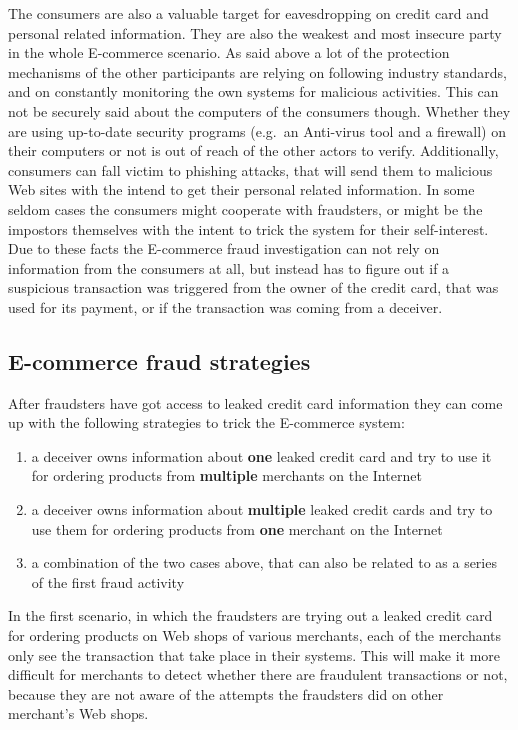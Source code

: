 The consumers are also a valuable target for eavesdropping on credit card and personal related information. They are also the weakest and most insecure party in the whole E-commerce scenario. As said above a lot of the protection mechanisms of the other participants are relying on following industry standards, and on constantly monitoring the own systems for malicious activities. This can not be securely said about the computers of the consumers though. Whether they are using up-to-date security programs (e.g.\ an Anti-virus tool and a firewall) on their computers or not is out of reach of the other actors to verify. Additionally, consumers can fall victim to phishing attacks, that will send them to malicious Web sites with the intend to get their personal related information. In some seldom cases the consumers might cooperate with fraudsters, or might be the impostors themselves with the intent to trick the system for their self-interest. Due to these facts the \gls{E-commerce} fraud investigation can not rely on information from the consumers at all, but instead has to figure out if a suspicious transaction was triggered from the owner of the credit card, that was used for its payment, or if the transaction was coming from a deceiver.


\subsection{E-commerce fraud strategies}
\label{subsec:strategies_fraudster}

After fraudsters have got access to leaked credit card information they can come up with the following strategies to trick the \gls{E-commerce} system:\@

\begin{enumerate}
  \item a deceiver owns information about \textbf{one} leaked credit card and try to use it for ordering products from \textbf{multiple} merchants on the Internet
  \item a deceiver owns information about \textbf{multiple} leaked credit cards and try to use them for ordering products from \textbf{one} merchant on the Internet
  \item a combination of the two cases above, that can also be related to as a series of the first fraud activity
\end{enumerate}

In the first scenario, in which the fraudsters are trying out a leaked credit card for ordering products on Web shops of various merchants, each of the merchants only see the transaction that take place in their systems. This will make it more difficult for merchants to detect whether there are fraudulent transactions or not, because they are not aware of the attempts the fraudsters did on other merchant's Web shops. \\

